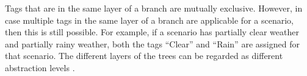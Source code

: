 Tags that are in the same layer of a branch are mutually exclusive. However, in case multiple tags in the same layer of a branch are applicable for a scenario, then this is still possible. For example, if a scenario has partially clear weather and partially rainy weather, both the tags ``Clear'' and ``Rain'' are assigned for that scenario. The different layers of the trees can be regarded as different abstraction levels \cite{Bonnin2014}.

%
%

